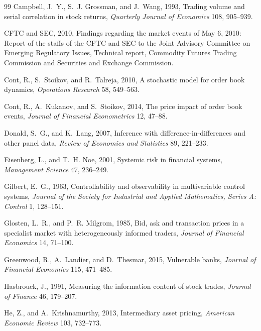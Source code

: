 \documentclass[12pt]{article}
\theoremstyle{definition}
\theoremstyle{remark}
\begin{document}
\begin{thebibliography}{99}
Campbell, J.~Y., S.~J. Grossman, and J.~Wang, 1993, Trading volume and serial correlation in stock returns, \emph{Quarterly Journal of Economics} 108, 905--939.

CFTC and SEC, 2010, Findings regarding the market events of May 6, 2010: Report of the staffs of the CFTC and SEC to the Joint Advisory Committee on Emerging Regulatory Issues, Technical report, Commodity Futures Trading Commission and Securities and Exchange Commission.

Cont, R., S.~Stoikov, and R.~Talreja, 2010, A stochastic model for order book dynamics, \emph{Operations Research} 58, 549--563.

Cont, R., A.~Kukanov, and S.~Stoikov, 2014, The price impact of order book events, \emph{Journal of Financial Econometrics} 12, 47--88.

Donald, S.~G., and K.~Lang, 2007, Inference with difference-in-differences and other panel data, \emph{Review of Economics and Statistics} 89, 221--233.

Eisenberg, L., and T.~H. Noe, 2001, Systemic risk in financial systems, \emph{Management Science} 47, 236--249.

Gilbert, E.~G., 1963, Controllability and observability in multivariable control systems, \emph{Journal of the Society for Industrial and Applied Mathematics, Series A: Control} 1, 128--151.

Glosten, L.~R., and P.~R. Milgrom, 1985, Bid, ask and transaction prices in a specialist market with heterogeneously informed traders, \emph{Journal of Financial Economics} 14, 71--100.

Greenwood, R., A.~Landier, and D.~Thesmar, 2015, Vulnerable banks, \emph{Journal of Financial Economics} 115, 471--485.

Hasbrouck, J., 1991, Measuring the information content of stock trades, \emph{Journal of Finance} 46, 179--207.

He, Z., and A.~Krishnamurthy, 2013, Intermediary asset pricing, \emph{American Economic Review} 103, 732--773.


\end{thebibliography}
\end{document}

